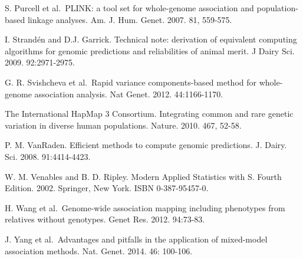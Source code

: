 \documentclass[
]{article}
\begin{document}
S. Purcell et al.~PLINK: a tool set for whole-genome association and
population-based linkage analyses. Am. J. Hum. Genet. 2007. 81, 559-575.

I. Strandén and D.J. Garrick. Technical note: derivation of equivalent
computing algorithms for genomic predictions and reliabilities of animal
merit. J Dairy Sci. 2009. 92:2971-2975.

G. R. Svishcheva et al.~Rapid variance components-based method for
whole-genome association analysis. Nat Genet. 2012. 44:1166-1170.

The International HapMap 3 Consortium. Integrating common and rare
genetic variation in diverse human populations. Nature. 2010. 467,
52-58.

P. M. VanRaden. Efficient methods to compute genomic predictions. J.
Dairy. Sci. 2008. 91:4414-4423.

W. M. Venables and B. D. Ripley. Modern Applied Statistics with S.
Fourth Edition. 2002. Springer, New York. ISBN 0-387-95457-0.

H. Wang et al.~Genome-wide association mapping including phenotypes from
relatives without genotypes. Genet Res. 2012. 94:73-83.

J. Yang et al.~Advantages and pitfalls in the application of mixed-model
association methods. Nat. Genet. 2014. 46: 100-106.
\end{document}
